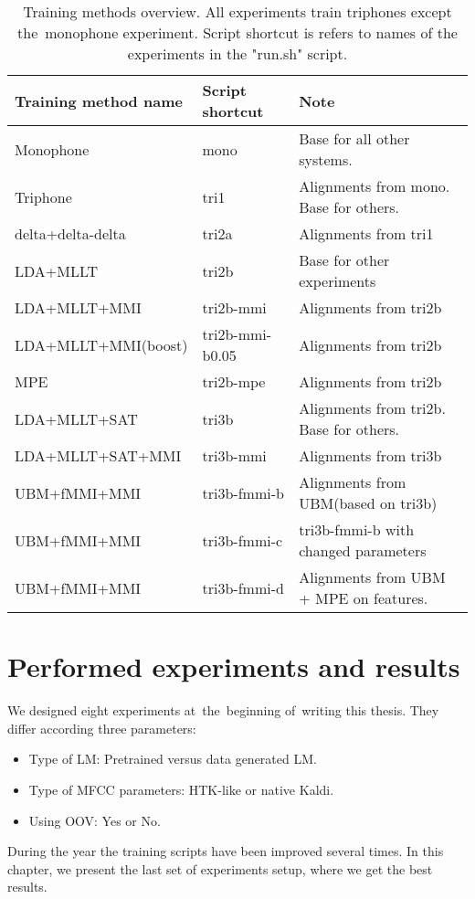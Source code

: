 \begin{table}[!htp]\label{tab:disc_train}
\small{\begin{tabular}{lll}
\hline
Training method name & Script shortcut & Note\\
\hline
Monophone & mono & Base for all other systems.\\
Triphone  & tri1 &  Alignments from mono. Base for others.\\
delta+delta-delta & tri2a & Alignments from tri1 \\
\ac{LDA}+\ac{MLLT} & tri2b &  Base for other experiments \\
\ac{LDA}+\ac{MLLT}+\ac{MMI} & tri2b-mmi & Alignments from tri2b \\
\ac{LDA}+\ac{MLLT}+\ac{MMI}(boost) & tri2b-mmi-b0.05  & Alignments from tri2b \\
\ac{MPE} & tri2b-mpe & Alignments from tri2b \\
\ac{LDA}+\ac{MLLT}+\ac{SAT} & tri3b & Alignments from tri2b. Base for others. \\
\ac{LDA}+\ac{MLLT}+\ac{SAT}+\ac{MMI} & tri3b-mmi  & Alignments from tri3b \\
\ac{UBM}+\ac{fMMI}+\ac{MMI} & tri3b-fmmi-b & Alignments from \ac{UBM}(based on tri3b) \\
\ac{UBM}+\ac{fMMI}+\ac{MMI} & tri3b-fmmi-c & tri3b-fmmi-b with changed parameters \\
\ac{UBM}+\ac{fMMI}+\ac{MMI} & tri3b-fmmi-d & Alignments from \ac{UBM} + \ac{MPE} on features.\\ 
\end{tabular}}
\caption{Training methods overview. All experiments train triphones except the~monophone experiment. Script shortcut is refers to names of the experiments in the "run.sh" script.}
\end{table}


\section{Performed experiments and results} 
\label{sec:exps}
We designed eight experiments at~the~beginning of~writing this thesis.
They differ according three parameters:
\begin{itemize}
    \item Type of \ac{LM}: Pretrained versus data generated \ac{LM}.
    \item Type of \ac{MFCC} parameters: \ac{HTK}-like or native Kaldi.
    \item Using \ac{OOV}: Yes or No.
\end{itemize}
During the year the training scripts have been improved several times. 
In this chapter, we present the last set of experiments setup, where we get the best results.

